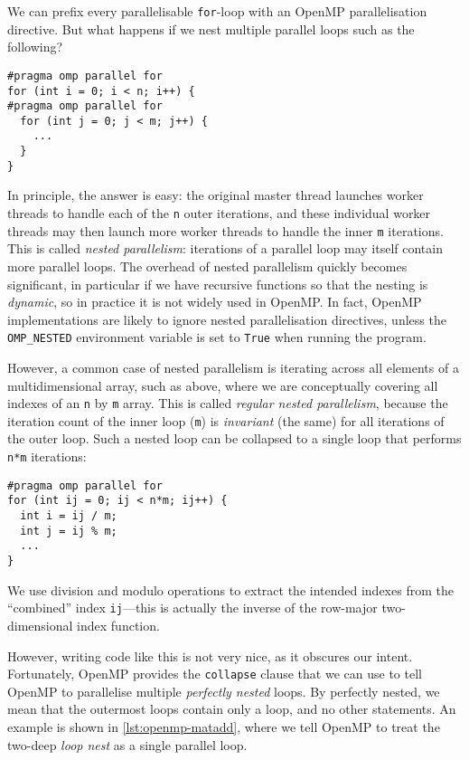 We can prefix every parallelisable \lstinline{for}-loop with an OpenMP
parallelisation directive.  But what happens if we nest multiple
parallel loops such as the following?

\begin{lstlisting}
#pragma omp parallel for
for (int i = 0; i < n; i++) {
#pragma omp parallel for
  for (int j = 0; j < m; j++) {
    ...
  }
}
\end{lstlisting}

In principle, the answer is easy: the original master thread launches
worker threads to handle each of the \texttt{n} outer iterations, and
these individual worker threads may then launch more worker threads to
handle the inner \texttt{m} iterations.  This is called \emph{nested
  parallelism}: iterations of a parallel loop may itself contain more
parallel loops.  The overhead of nested parallelism quickly becomes
significant, in particular if we have recursive functions so that the
nesting is \emph{dynamic}, so in practice it is not widely used in
OpenMP.  In fact, OpenMP implementations are likely to ignore nested
parallelisation directives, unless the \lstinline{OMP_NESTED}
environment variable is set to \lstinline{True} when running the
program.

However, a common case of nested parallelism is iterating across all
elements of a multidimensional array, such as above, where we are
conceptually covering all indexes of an \texttt{n} by \texttt{m}
array.  This is called \emph{regular nested parallelism}, because the
iteration count of the inner loop (\texttt{m}) is \emph{invariant}
(the same) for all iterations of the outer loop.  Such a nested loop
can be collapsed to a single loop that performs \texttt{n*m} iterations:

\begin{minipage}{1.0\linewidth}
\begin{lstlisting}
#pragma omp parallel for
for (int ij = 0; ij < n*m; ij++) {
  int i = ij / m;
  int j = ij % m;
  ...
}
\end{lstlisting}
\end{minipage}

We use division and modulo operations to extract the intended indexes
from the ``combined'' index \texttt{ij}---this is actually the inverse
of the row-major two-dimensional index function.

However, writing code like this is not very nice, as it obscures our
intent.  Fortunately, OpenMP provides the \texttt{collapse} clause
that we can use to tell OpenMP to parallelise multiple \emph{perfectly
  nested} loops.  By perfectly nested, we mean that the outermost
loops contain only a loop, and no other statements.  An example is
shown in \cref{lst:openmp-matadd}, where we tell OpenMP to treat the
two-deep \emph{loop nest} as a single parallel loop.

